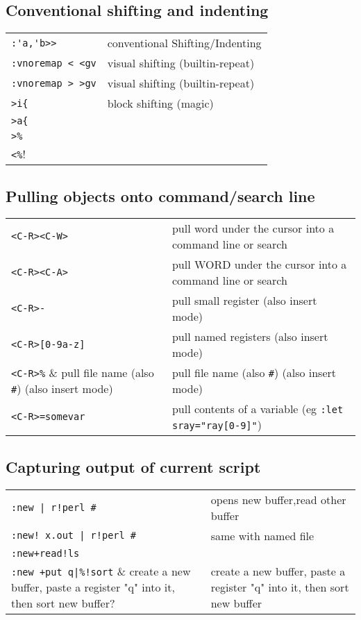 \subsection{Conventional shifting and indenting}
\begin{center}
\begin{longtable}{l|l}
 \verb!:'a,'b>>! & conventional Shifting/Indenting\\
 \verb!:vnoremap < <gv! & visual shifting (builtin-repeat)\\
 \verb!:vnoremap > >gv! & visual shifting (builtin-repeat)\\
 \verb!>i{! & block shifting (magic)\\
 \verb!>a{!\\
 \verb!>%!\\
 \verb!<%!
\end{longtable}
\end{center}

\subsection{Pulling objects onto command/search line}
\begin{center}
\begin{longtable}{l|l}
\verb!<C-R><C-W>! & pull word under the cursor into a command line or search\\
\verb!<C-R><C-A>! & pull WORD under the cursor into a command line or search\\
\verb!<C-R>-! & pull small register (also insert mode)\\
\verb!<C-R>[0-9a-z]! & pull named registers (also insert mode)\\
\verb!<C-R>%! & pull file name (also \verb!#!) (also insert mode)\\
\verb!<C-R>=somevar! & pull contents of a variable (eg \verb!:let sray="ray[0-9]"!)
\end{longtable}
\end{center}

\subsection{Capturing output of current script}
\begin{center}
\begin{longtable}{l|l}
 \verb?:new | r!perl #? & opens new buffer,read other buffer\\
 \verb?:new! x.out | r!perl #? & same with named file\\
 \verb?:new+read!ls?\\
 \verb?:new +put q|%!sort? & create a new buffer, paste a register "q" into it, then sort new buffer
\end{longtable}
\end{center}


